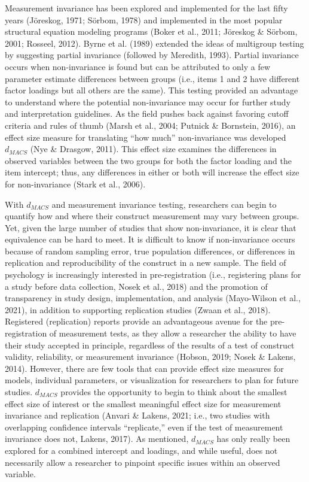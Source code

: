 \documentclass[
  man,floatsintext]{apa7}
\begin{document}
Measurement invariance has been explored and implemented for the last fifty years (Jöreskog, 1971; Sörbom, 1978) and implemented in the most popular structural equation modeling programs (Boker et al., 2011; Jöreskog \& Sörbom, 2001; Rosseel, 2012). Byrne et al. (1989) extended the ideas of multigroup testing by suggesting partial invariance (followed by Meredith, 1993). Partial invariance occurs when non-invariance is found but can be attributed to only a few parameter estimate differences between groups (i.e., items 1 and 2 have different factor loadings but all others are the same). This testing provided an advantage to understand where the potential non-invariance may occur for further study and interpretation guidelines. As the field pushes back against favoring cutoff criteria and rules of thumb (Marsh et al., 2004; Putnick \& Bornstein, 2016), an effect size measure for translating ``how much'' non-invariance was developed \(d_{MACS}\) (Nye \& Drasgow, 2011). This effect size examines the differences in observed variables between the two groups for both the factor loading and the item intercept; thus, any differences in either or both will increase the effect size for non-invariance (Stark et al., 2006).

With \(d_{MACS}\) and measurement invariance testing, researchers can begin to quantify how and where their construct measurement may vary between groups. Yet, given the large number of studies that show non-invariance, it is clear that equivalence can be hard to meet. It is difficult to know if non-invariance occurs because of random sampling error, true population differences, or differences in replication and reproducibility of the construct in a new sample. The field of psychology is increasingly interested in pre-registration (i.e., registering plans for a study before data collection, Nosek et al., 2018) and the promotion of transparency in study design, implementation, and analysis (Mayo-Wilson et al., 2021), in addition to supporting replication studies (Zwaan et al., 2018). Registered (replication) reports provide an advantageous avenue for the pre-registration of measurement tests, as they allow a researcher the ability to have their study accepted in principle, regardless of the results of a test of construct validity, reliability, or measurement invariance (Hobson, 2019; Nosek \& Lakens, 2014). However, there are few tools that can provide effect size measures for models, individual parameters, or visualization for researchers to plan for future studies. \(d_{MACS}\) provides the opportunity to begin to think about the smallest effect size of interest or the smallest meaningful effect size for measurement invariance and replication (Anvari \& Lakens, 2021; i.e., two studies with overlapping confidence intervals ``replicate,'' even if the test of measurement invariance does not, Lakens, 2017). As mentioned, \(d_{MACS}\) has only really been explored for a combined intercept and loadings, and while useful, does not necessarily allow a researcher to pinpoint specific issues within an observed variable.
\end{document}
